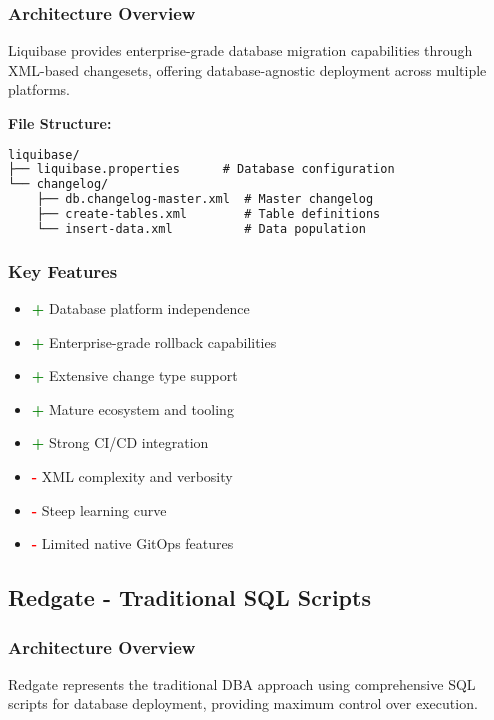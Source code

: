 \subsubsection{Architecture Overview}
Liquibase provides enterprise-grade database migration capabilities through XML-based changesets, offering database-agnostic deployment across multiple platforms.

\textbf{File Structure:}
\begin{lstlisting}[language=XML, caption=Liquibase Configuration Structure]
liquibase/
├── liquibase.properties      # Database configuration
└── changelog/
    ├── db.changelog-master.xml  # Master changelog
    ├── create-tables.xml        # Table definitions
    └── insert-data.xml          # Data population
\end{lstlisting}

\subsubsection{Key Features}
\begin{itemize}
    \item \textcolor{green}{\textbf{+}} Database platform independence
    \item \textcolor{green}{\textbf{+}} Enterprise-grade rollback capabilities
    \item \textcolor{green}{\textbf{+}} Extensive change type support
    \item \textcolor{green}{\textbf{+}} Mature ecosystem and tooling
    \item \textcolor{green}{\textbf{+}} Strong CI/CD integration
    \item \textcolor{red}{\textbf{-}} XML complexity and verbosity
    \item \textcolor{red}{\textbf{-}} Steep learning curve
    \item \textcolor{red}{\textbf{-}} Limited native GitOps features
\end{itemize}

\subsection{Redgate - Traditional SQL Scripts}

\subsubsection{Architecture Overview}
Redgate represents the traditional DBA approach using comprehensive SQL scripts for database deployment, providing maximum control over execution.

